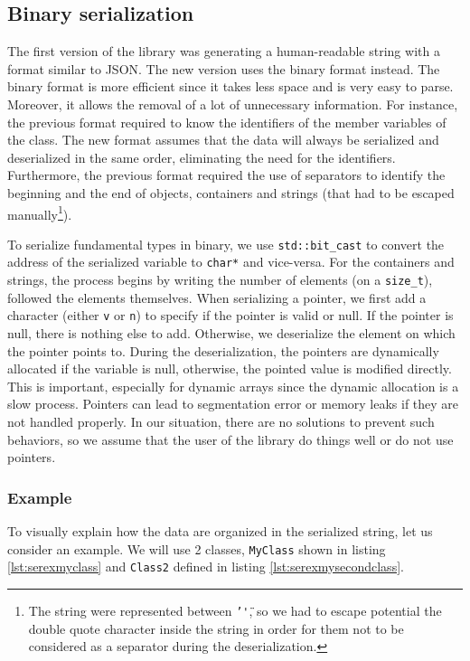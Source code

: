 \subsection{Binary serialization}

The first version of the library was generating a human-readable string with a
format similar to JSON. The new version uses the binary format instead. The
binary format is more efficient since it takes less space and is very easy to
parse. Moreover, it allows the removal of a lot of unnecessary information. For
instance, the previous format required to know the identifiers of the member
variables of the class. The new format assumes that the data will always be
serialized and deserialized in the same order, eliminating the need for the
identifiers. Furthermore, the previous format required the use of separators to
identify the beginning and the end of objects, containers and strings (that had
to be escaped manually\footnote{The string were represented between
\texttt{'\"'}, so we had to escape potential the double quote character inside
the string in order for them not to be considered as a separator during the
deserialization.}).

To serialize fundamental types in binary, we use \texttt{std::bit\_cast} to
convert the address of the serialized variable to \texttt{char*} and vice-versa.
For the containers and strings, the process begins by writing the number of
elements (on a \texttt{size\_t}), followed the elements themselves. When
serializing a pointer, we first add a character (either \texttt{v} or
\texttt{n}) to specify if the pointer is valid or null. If the pointer is null,
there is nothing else to add. Otherwise, we deserialize the element on which the
pointer points to. During the deserialization, the pointers are dynamically
allocated if the variable is null, otherwise, the pointed value is modified
directly. This is important, especially for dynamic arrays since the dynamic
allocation is a slow process. Pointers can lead to segmentation error or memory
leaks if they are not handled properly. In our situation, there are no solutions
to prevent such behaviors, so we assume that the user of the library do things
well or do not use pointers.

\subsubsection{Example}

To visually explain how the data are organized in the serialized string, let us
consider an example. We will use 2 classes, \texttt{MyClass} shown in listing
\ref{lst:serexmyclass} and \texttt{Class2} defined in listing
\ref{lst:serexmysecondclass}.

